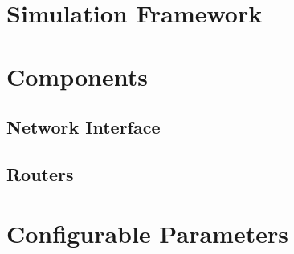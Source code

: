 \section{Simulation Framework}

\section{Components}
\subsection{Network Interface}
\subsection{Routers}

\section{Configurable Parameters}

